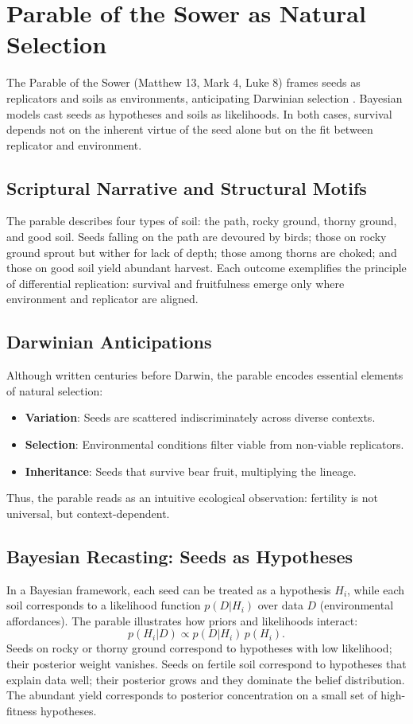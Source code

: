 \documentclass[a4paper,11pt,openany]{book}
\begin{document}
\chapter{Parable of the Sower as Natural Selection}

The Parable of the Sower (Matthew 13, Mark 4, Luke 8) frames seeds as replicators and soils 
as environments, anticipating Darwinian selection \citep{bibleSower}. Bayesian models cast 
seeds as hypotheses and soils as likelihoods. In both cases, survival depends not on the 
inherent virtue of the seed alone but on the fit between replicator and environment.  

\section{Scriptural Narrative and Structural Motifs}
The parable describes four types of soil: the path, rocky ground, thorny ground, and good 
soil. Seeds falling on the path are devoured by birds; those on rocky ground sprout but wither 
for lack of depth; those among thorns are choked; and those on good soil yield abundant 
harvest. Each outcome exemplifies the principle of differential replication: survival and 
fruitfulness emerge only where environment and replicator are aligned.

\section{Darwinian Anticipations}
Although written centuries before Darwin, the parable encodes essential elements of natural 
selection:
\begin{itemize}
  \item \textbf{Variation}: Seeds are scattered indiscriminately across diverse contexts.  
  \item \textbf{Selection}: Environmental conditions filter viable from non-viable replicators.  
  \item \textbf{Inheritance}: Seeds that survive bear fruit, multiplying the lineage.  
\end{itemize}
Thus, the parable reads as an intuitive ecological observation: fertility is not universal, but 
context-dependent.

\section{Bayesian Recasting: Seeds as Hypotheses}
In a Bayesian framework, each seed can be treated as a hypothesis $H_i$, while each soil 
corresponds to a likelihood function $p(D|H_i)$ over data $D$ (environmental affordances).  
The parable illustrates how priors and likelihoods interact:
\[
p(H_i|D) \propto p(D|H_i)\,p(H_i).
\]
Seeds on rocky or thorny ground correspond to hypotheses with low likelihood; their posterior 
weight vanishes. Seeds on fertile soil correspond to hypotheses that explain data well; their 
posterior grows and they dominate the belief distribution. The abundant yield corresponds to 
posterior concentration on a small set of high-fitness hypotheses.
\end{document}
